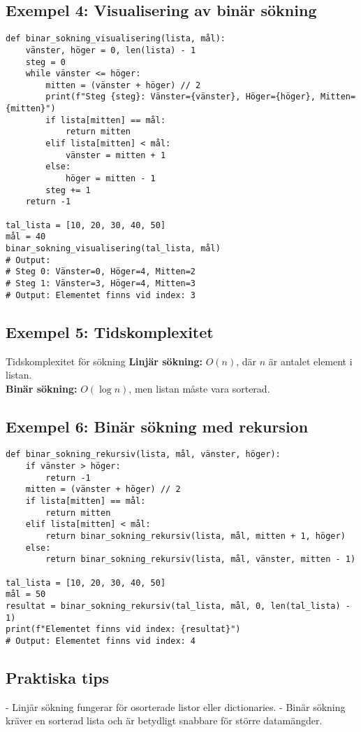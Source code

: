 \subsection*{Exempel 4: Visualisering av binär sökning}

\begin{lstlisting}[title=Binär sökning - Visualisering]
def binar_sokning_visualisering(lista, mål):
    vänster, höger = 0, len(lista) - 1
    steg = 0
    while vänster <= höger:
        mitten = (vänster + höger) // 2
        print(f"Steg {steg}: Vänster={vänster}, Höger={höger}, Mitten={mitten}")
        if lista[mitten] == mål:
            return mitten
        elif lista[mitten] < mål:
            vänster = mitten + 1
        else:
            höger = mitten - 1
        steg += 1
    return -1

tal_lista = [10, 20, 30, 40, 50]
mål = 40
binar_sokning_visualisering(tal_lista, mål)
# Output:
# Steg 0: Vänster=0, Höger=4, Mitten=2
# Steg 1: Vänster=3, Höger=4, Mitten=3
# Output: Elementet finns vid index: 3
\end{lstlisting}

\subsection*{Exempel 5: Tidskomplexitet}

\begin{rconceptbox}{Tidskomplexitet för sökning}{
\textbf{Linjär sökning:} $O(n)$, där $n$ är antalet element i listan.\\
\textbf{Binär sökning:} $O(\log n)$, men listan måste vara sorterad.
}
\end{rconceptbox}

\subsection*{Exempel 6: Binär sökning med rekursion}

\begin{lstlisting}[title=Binär sökning - Rekursiv implementation]
def binar_sokning_rekursiv(lista, mål, vänster, höger):
    if vänster > höger:
        return -1
    mitten = (vänster + höger) // 2
    if lista[mitten] == mål:
        return mitten
    elif lista[mitten] < mål:
        return binar_sokning_rekursiv(lista, mål, mitten + 1, höger)
    else:
        return binar_sokning_rekursiv(lista, mål, vänster, mitten - 1)

tal_lista = [10, 20, 30, 40, 50]
mål = 50
resultat = binar_sokning_rekursiv(tal_lista, mål, 0, len(tal_lista) - 1)
print(f"Elementet finns vid index: {resultat}")
# Output: Elementet finns vid index: 4
\end{lstlisting}

\subsection*{Praktiska tips}
- Linjär sökning fungerar för osorterade listor eller dictionaries.
- Binär sökning kräver en sorterad lista och är betydligt snabbare för större datamängder.
